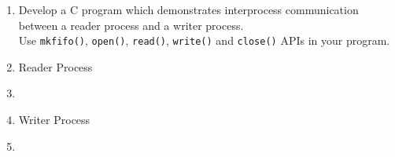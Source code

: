 \documentclass{article}
\newcommand{\question}[2]{
	\item [#1.] #2
}
\newcommand{\ttt}[1]{\texttt{#1}}
\newcommand{\answer}[1]{\item[] \inputminted{c}{#1}}
\begin{document}
	\begin{enumerate}[label=\roman*)]
		\question{4}{
			Develop a C program which demonstrates interprocess communication between a reader process and a writer process. \\
			Use \ttt{mkfifo()}, \ttt{open()}, \ttt{read()}, \ttt{write()} and \ttt{close()} APIs in your program.
		}

		\item Reader Process
		\answer{lab4.reader.c} \newpage

		\item Writer Process
		\answer{lab4.writer.c}
	\end{enumerate}
\end{document}
